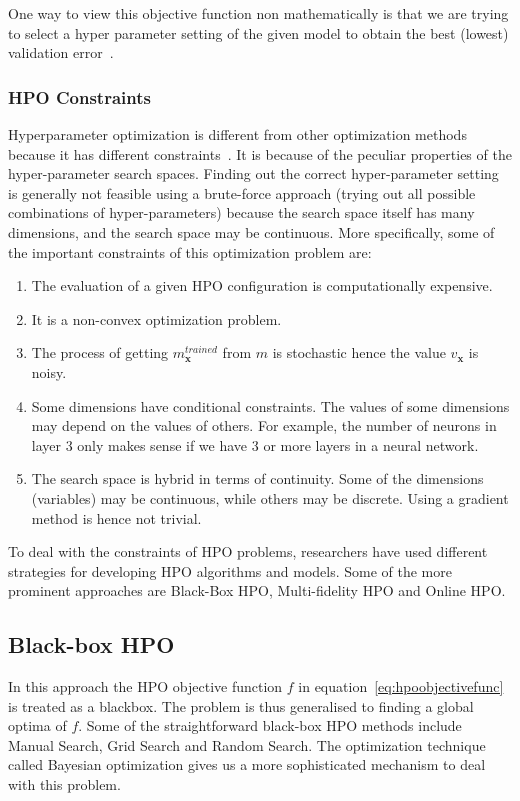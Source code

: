 \documentclass[12pt, twoside, ngerman]{report}
\begin{document}
One way to view this objective function non mathematically is that we are trying to select a hyper parameter setting of the given model to obtain the best (lowest) validation error~\cite{fsbopaper}.

\subsubsection{HPO Constraints}\label{sec:hpoConstraints}

Hyperparameter optimization is different from other optimization methods because it has different constraints~\cite{bayesianOptimizationTutorial}.
It is because of the peculiar properties of the hyper-parameter search spaces.
Finding out the correct hyper-parameter setting is generally not feasible using a brute-force approach (trying out all possible combinations of hyper-parameters) because the search space itself has many dimensions, and the search space may be continuous.
More specifically,  some of the important constraints of this optimization problem are:

\begin{enumerate}
\item The evaluation of a given HPO configuration is computationally expensive.
\item It is a non-convex optimization problem.
\item The process of getting $m^{trained}_\textbf{x}$ from $m$ is stochastic hence the value $v_{\textbf{x}}$ is noisy.
\item Some dimensions have conditional constraints. The values of some dimensions may depend on the values of others. For example, the number of neurons in layer 3 only makes sense if we have 3 or more layers in a neural network.
\item The search space is hybrid in terms of continuity. Some of the dimensions (variables) may be continuous, while others may be discrete.
Using a gradient method is hence not trivial.
\end{enumerate}

To deal with the constraints of HPO problems, researchers have used different strategies for developing HPO algorithms and models.
Some of the more prominent approaches are Black-Box HPO, 
Multi-fidelity HPO and Online HPO.

\subsection{Black-box HPO}
In this approach the HPO objective function $f$ in equation~\ref{eq:hpoobjectivefunc}
is treated as a blackbox.
The problem is thus generalised to finding a global optima of $f$.
Some of the straightforward black-box HPO methods include Manual Search,  Grid Search and Random Search.
The optimization technique called Bayesian optimization gives us a more sophisticated mechanism to deal with this problem. 
\end{document}
